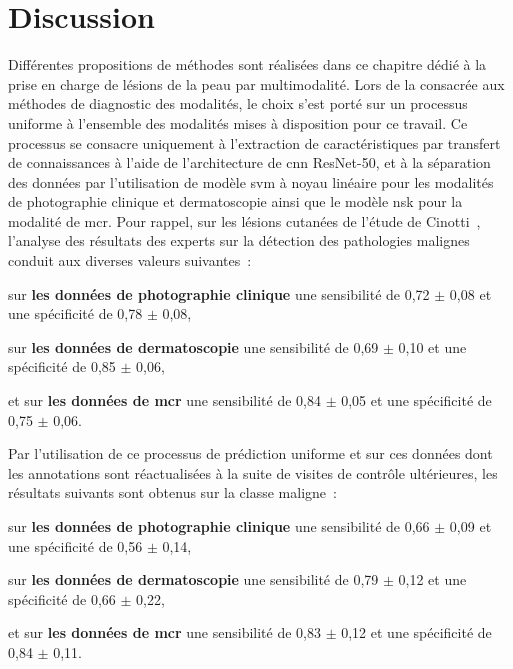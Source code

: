 \section{Discussion}
Différentes propositions de méthodes sont réalisées dans ce chapitre dédié à la prise en charge de lésions de la peau par multimodalité. Lors de la  consacrée aux méthodes de diagnostic des modalités, le choix s'est porté sur un processus uniforme à l'ensemble des modalités mises à disposition pour ce travail. Ce processus se consacre uniquement à l'extraction de caractéristiques par transfert de connaissances à l'aide de l'architecture de \gls{cnn} ResNet-50, et à la séparation des données par l'utilisation de modèle \gls{svm} à noyau linéaire pour les modalités de photographie clinique et dermatoscopie ainsi que le modèle \gls{nsk} pour la modalité de \gls{mcr}. Pour rappel, sur les lésions cutanées de l'étude de Cinotti~, l'analyse des résultats des experts sur la détection des pathologies malignes conduit aux diverses valeurs suivantes~: 
\begin{inlinerate}
    \item sur \textbf{les données de photographie clinique} une sensibilité de 0,72 $\pm$ 0,08 et une spécificité de 0,78 $\pm$ 0,08,
    \item sur \textbf{les données de dermatoscopie} une sensibilité de 0,69 $\pm$ 0,10 et une spécificité de 0,85 $\pm$ 0,06,
    \item et sur \textbf{les données de \gls{mcr}} une sensibilité de 0,84 $\pm$ 0,05 et une spécificité de 0,75 $\pm$ 0,06.
\end{inlinerate} Par l'utilisation de ce processus de prédiction uniforme et sur ces données dont les annotations sont réactualisées à la suite de visites de contrôle ultérieures, les résultats suivants sont obtenus sur la classe maligne~:
\begin{inlinerate}
    \item sur \textbf{les données de photographie clinique} une sensibilité de 0,66 $\pm$ 0,09 et une spécificité de 0,56 $\pm$ 0,14,
    \item sur \textbf{les données de dermatoscopie} une sensibilité de 0,79 $\pm$ 0,12 et une spécificité de 0,66 $\pm$ 0,22,
    \item et sur \textbf{les données de \gls{mcr}} une sensibilité de 0,83 $\pm$ 0,12 et une spécificité de 0,84 $\pm$ 0,11.
\end{inlinerate}\par

